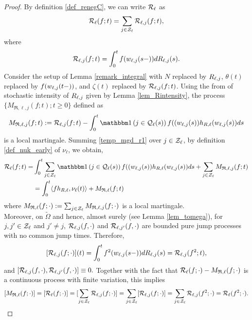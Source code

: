 \documentclass{article}
\theoremstyle{definition}
\numberwithin{equation}{section}
\begin{document}
\begin{proof}
  By definition \eqref{def_renegC}, we can write $\mathcal{R}_\ell$ as
\begin{equation}\label{def_Rl_decomp}
\mathcal{R}_\ell(f;t)=\sum_{j\in\mathcal{Z}_\ell} \mathcal{R}_{\ell,j}(f;t),
\end{equation}
where
\begin{equation}\label{def_RClj}
\mathcal{R}_{\ell,j}(f;t)= \int_0^tf(w_{\ell,j}(s-))dR_{\ell,j}(s).
\end{equation}
Consider the setup of Lemma \ref{remark_integral} with $N$ replaced by $R_{\ell,j}$,  $\theta(t)$ replaced by $f(w_{\ell,j}(t-))$, and $\zeta(t)$ replaced by $\mathcal{R}_{\ell,j}(f;t)$. Using the from of stochastic intensity of $R_{\ell,j}$ given by Lemma \ref{lem_Rintensity}, the process $\{M_{\mathfrak{R},\ell,j}(f;t);t\geq0\}$ defined as
\begin{equation}\label{temp_mgd_r1}
M_{\mathfrak{R},\ell,j}(f;t) := \renegC_{\ell,j}(f;t) - \int_0^t \indic{j\in\inque_\ell(s)} f((\waiting_{\ell,j}(s)) h_{R,\ell}(\waiting_{\ell,j}(s))ds
\end{equation}
is a local martingale. Summing \eqref{temp_mgd_r1} over $j\in\mathcal{Z}_\ell$, by definition \eqref{def_nuk_early} of $\nu_\ell$, we obtain,
\begin{align*}
  \renegC_\ell(f;t) = &  \int_0^t \sum_{j\in\indexSet_\ell} \indic{j\in\inque_\ell(s)} f((\waiting_{\ell,j}(s)) h_{R,\ell}(\waiting_{\ell,j}(s))ds + \sum_{j\in\indexSet_\ell}M_{\mathfrak{R},\ell,j}(f;t)\\
  & = \int_0^t \langle f h_{R,\ell},\nu_\ell(t) \rangle + M_{\mathfrak{R},\ell}(f;t)
\end{align*}
where $M_{\mathfrak{R},\ell} (f;\cdot):= \sum_{j\in \mathcal{Z}_\ell}M_{\mathfrak{R},\ell,j}(f;\cdot)$ is a local martingale.\\


Moreover, on $\tilde\Omega$ and hence, almost surely (see Lemma \ref{lem_tomega}), for $j,j'\in\mathcal{Z}_\ell$  and $j'\neq j$, $\mathcal{R}_{\ell,j}(f,\cdot)$ and $\mathcal{R}_{\ell,j'}(f,\cdot)$ are bounded pure jump processes with no common jump times. Therefore,
\[
[\mathcal{R}_{\ell,j}(f;\cdot)](t) = \int_{0}^{t} f^2(w_{\ell,j}(s-))dR_{\ell,j}(s) = \mathcal{R}_{\ell,j}(f^2;t),
\]
and $[ \mathcal{R}_{\ell,j}(f,\cdot),\mathcal{R}_{\ell,j'}(f,\cdot)] \equiv 0.$  Together with the fact that $\mathcal{R}_{\ell}(f;\cdot)-M_{\mathfrak{R},\ell}(f;\cdot)$ is a continuous process with finite variation, this implies
\[ [M_{\mathfrak{R},\ell}(f;\cdot)] = [\mathcal{R}_{\ell}(f;\cdot)] = [\sum_{j\in\mathcal{Z}_\ell}\mathcal{R}_{\ell,j}(f;\cdot)] = \sum_{j\in\mathcal{Z}_\ell}[\mathcal{R}_{\ell,j}(f;\cdot)] =\sum_{j\in\mathcal{Z}_\ell}\mathcal{R}_{\ell,j}(f^2;\cdot)=\mathcal{R}_{\ell}(f^2;\cdot). \]
\end{proof}
\end{document}
